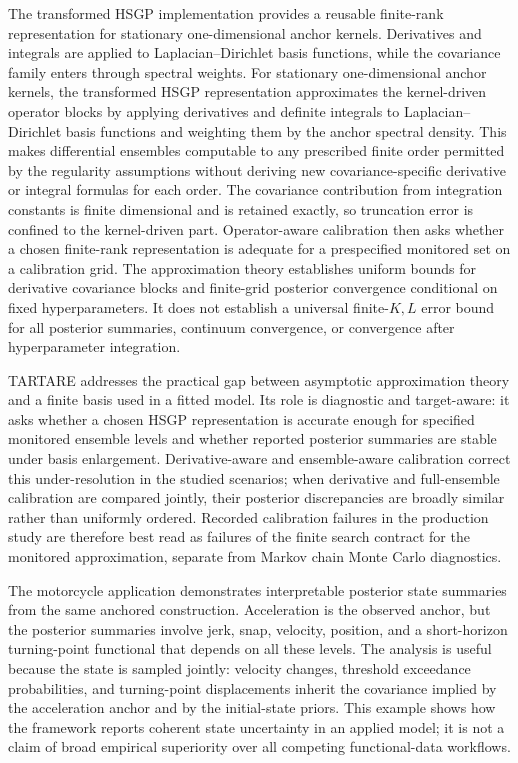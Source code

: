 \documentclass[11pt,a4paper]{article}
\theoremstyle{definition}
\theoremstyle{remark}
\begin{document}
The transformed HSGP implementation provides a reusable finite-rank representation for stationary one-dimensional anchor kernels. Derivatives and integrals are applied to Laplacian--Dirichlet basis functions, while the covariance family enters through spectral weights.  For stationary one-dimensional anchor kernels, the transformed HSGP representation approximates the kernel-driven operator blocks by applying derivatives and definite integrals to Laplacian--Dirichlet basis functions and weighting them by the anchor spectral density.  This makes differential ensembles computable to any prescribed finite order permitted by the regularity assumptions without deriving new covariance-specific derivative or integral formulas for each order.  The covariance contribution from integration constants is finite dimensional and is retained exactly, so truncation error is confined to the kernel-driven part.  Operator-aware calibration then asks whether a chosen finite-rank representation is adequate for a prespecified monitored set on a calibration grid.  The approximation theory establishes uniform bounds for derivative covariance blocks and finite-grid posterior convergence conditional on fixed hyperparameters. It does not establish a universal finite-\(K,L\) error bound for all posterior summaries, continuum convergence, or convergence after hyperparameter integration.

TARTARE addresses the practical gap between asymptotic approximation theory and a finite basis used in a fitted model. Its role is diagnostic and target-aware: it asks whether a chosen HSGP representation is accurate enough for specified monitored ensemble levels and whether reported posterior summaries are stable under basis enlargement.  Derivative-aware and ensemble-aware calibration correct this under-resolution in the studied scenarios; when derivative and full-ensemble calibration are compared jointly, their posterior discrepancies are broadly similar rather than uniformly ordered.  Recorded calibration failures in the production study are therefore best read as failures of the finite search contract for the monitored approximation, separate from Markov chain Monte Carlo diagnostics.

The motorcycle application demonstrates interpretable posterior state summaries from the same anchored construction.  Acceleration is the observed anchor, but the posterior summaries involve jerk, snap, velocity, position, and a short-horizon turning-point functional that depends on all these levels.  The analysis is useful because the state is sampled jointly: velocity changes, threshold exceedance probabilities, and turning-point displacements inherit the covariance implied by the acceleration anchor and by the initial-state priors.  This example shows how the framework reports coherent state uncertainty in an applied model; it is not a claim of broad empirical superiority over all competing functional-data workflows.
\end{document}

